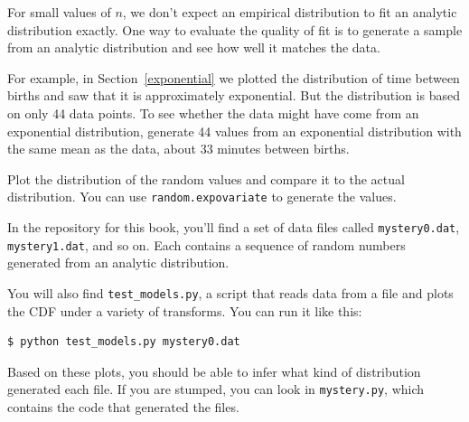 \documentclass[12pt]{book}
\begin{document}
\begin{exercise}
For small values of $n$, we don't expect an empirical distribution
to fit an analytic distribution exactly.  One way to evaluate
the quality of fit is to generate a sample from an analytic
distribution and see how well it matches the data.

For example, in Section~\ref{exponential} we plotted the distribution
of time between births and saw that it is approximately exponential.
But the distribution is based on only 44 data points.  To see whether
the data might have come from an exponential distribution, generate 44
values from an exponential distribution with the same mean as the
data, about 33 minutes between births.

Plot the distribution of the random values and compare it to the
actual distribution.  You can use \verb"random.expovariate" 
to generate the values.

\end{exercise}

\begin{exercise}
In the repository for this book, you'll find a set of data files
called \verb"mystery0.dat", \verb"mystery1.dat", and so on.  Each
contains a sequence of random numbers generated from an analytic
distribution.

You will also find \verb"test_models.py", a script that reads
data from a file and plots the CDF under a variety of transforms.
You can run it like this:

\begin{verbatim}
$ python test_models.py mystery0.dat
\end{verbatim}

Based on these plots, you should be able to infer what kind of
distribution generated each file.  If you are stumped, you can
look in \verb"mystery.py", which contains the code that generated
the files.

\end{exercise}
\end{document}
